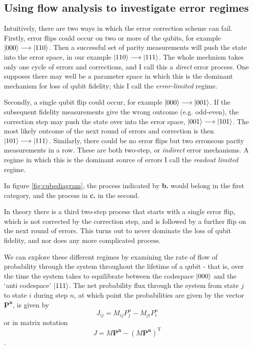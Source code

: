 \documentclass{report}
\begin{document}
\subsection{Using flow analysis to investigate error regimes}
Intuitively, there are two ways in which the error correction scheme can fail. Firstly, error flips could occur on two or more of the qubits, for example $\ket{000} \longrightarrow \ket{110}$. Then a successful set of parity measurements will push the state into the error space, in our example $\ket{110} \longrightarrow \ket{111}$. The whole mechnism takes only one cycle of errors and corrections, and I call this a \textit{direct} error process. One supposes there may well be a parameter space in which this is the dominant mechanism for loss of qubit fidelity; this I call the \textit{error-limited} regime.

Secondly, a single qubit flip could occur, for example $\ket{000} \longrightarrow \ket{001}$. If the subsequent fidelity measurements give the wrong outcome (e.g. odd-even), the correction step may push the state over into the error space, $\ket{001} \longrightarrow \ket{101}$. The most likely outcome of the next round of errors and correction is then $\ket{101} \longrightarrow \ket{111}$. Similarly, there could be no error flips but two erroneous parity measurements in a row. These are both two-step, or \textit{indirect} error mechanisms. A regime in which this is the dominant source of errors I call the \textit{readout limited} regime.

In figure \ref{fig:cubediagram}, the process indicated by \textbf{b.} would belong in the first category, and the process in \textbf{c.} in the second.

In theory there is a third two-step process that starts with a single error flip, which is not corrected by the correction step, and is followed by a further flip on the next round of errors. This turns out to never dominate the loss of qubit fidelity, and nor does any more complicated process.

We can explore these different regimes by examining the rate of flow of probability through the system throughout the lifetime of a qubit - that is, over the time the system takes to equilibrate between the codespace $\ket{000}$ and the `anti codespace' $\ket{111}$. The net probability flux through the system from state $j$ to state $i$ during step $n$, at which point the probabilities are given by the vector $\mathbf{P^n}$, is given by
\begin{equation*}
    J_{ij} = M_{ij}P^n_j - M_{ji} P^n_i
\end{equation*}
or in matrix notation
\begin{equation*}
    J = M\mathbf{P^n} - (M \mathbf{P^n})^\mathrm{T}
\end{equation*}.
\end{document}
